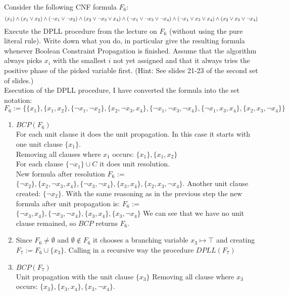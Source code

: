 \documentclass[addpoints,12pt]{exam}
\begin{document}
\begin{questions}
Consider the following CNF formula $F_6$:
\[(x_1) \land (x_1 \lor x_2) \land (\neg x_1 \lor \neg x_2) \land (x_2 \lor \neg x_3 \lor x_4) \\
\land (\neg x_1 \lor \neg x_3 \lor \neg x_4) \land (\neg x_1 \lor x_3 \lor x_4) \land (x_2 \lor x_3 \lor \neg x_4)\]
Execute the DPLL procedure from the lecture on $F_6$ (without using the pure literal rule).
Write down what you do, in particular give the
resulting formula whenever Boolean Constraint Propagation is finished. Assume that the
algorithm always picks  $x_i$ with the smallest $i$ not yet assigned and that it always tries
the positive phase of the picked variable first.
(Hint: See slides 21-23 of the second set of slides.)
\\
Esecution of the DPLL procedure, I have converted the formula into the set notation: \\
$F_6:=\{\{x_1\}, \{x_1 , x_2\} , \{\neg x_1 , \neg x_2\} , \{x_2 , \neg x_3 , x_4\} 
, \{\neg x_1 , \neg x_3 , \neg x_4\} , \{\neg x_1 , x_3 , x_4\} , \{x_2 , x_3 , \neg x_4\}\}$
\begin{enumerate}
    \item $BCP(F_6)$ \\
        For each unit clause it does the unit propagation.
        In this case it starts with one unit clause $\{x_1\}$. \\
        Removing all clauses where $x_1$ occurs: $\{x_1\},\{x_1 , x_2\}$\\
        For each clause $\{\neg x_1\} \cup C$ it does unit resolution. \\
        New formula after resolution $F_6$ := $\{\neg x_2\}, \{x_2 , \neg x_3 , x_4\}
        , \{\neg x_3 , \neg x_4\} , \{x_3 , x_4\} , \{x_2 , x_3 , \neg x_4\}$.
        Another unit clause created: $\{\neg x_2\}$.
        With the same reasoning as in the previous step the new formula after unit propagation is:
        $F_6$ := $\{\neg x_3 , x_4\}
        , \{\neg x_3 , \neg x_4\} , \{x_3 , x_4\} , \{x_3 , \neg x_4\}$
        We can see that we have no unit clause remained, so $BCP$ returns $F_6$.
    \item Since $F_6 \neq \emptyset$ and $\emptyset \notin F_6$ it chooses a branching 
        variable $x_3 \mapsto \top$ and creating $F_7:=F_6 \cup \{x_3\}$.
    Calling in a recursive way the procedure $DPLL(F_7)$\\
    \item $BCP(F_7)$ \\
    Unit propagation with the unit clause $\{x_3\}$
    Removing all clause where $x_3$ occurs: $\{x_3\},\{x_3 , x_4\},\{x_3 , \neg x_4\}$.\\

\end{enumerate}
\end{questions}
\end{document}
